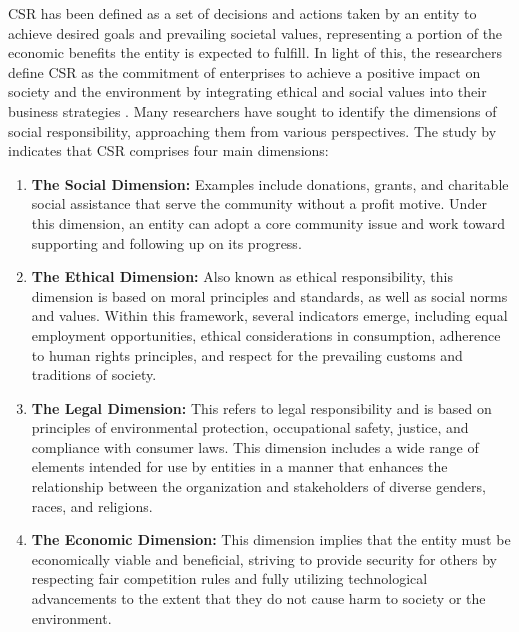 \documentclass{NSP1}
\begin{document}
CSR has been defined as a set of decisions and actions taken by an entity to achieve desired goals and prevailing societal values, representing a portion of the economic benefits the entity is expected to fulfill. In light of this, the researchers define CSR as the commitment of enterprises to achieve a positive impact on society and the environment by integrating ethical and social values into their business strategies \cite{ref6,ref20,ref40,ref39}. Many researchers have sought to identify the dimensions of social responsibility, approaching them from various perspectives. The study by \cite{ref25} indicates that CSR comprises four main dimensions:
\begin{enumerate}
\item[a)] \textbf{The Social Dimension:} Examples include donations, grants, and charitable social assistance that serve the community without a profit motive. Under this dimension, an entity can adopt a core community issue and work toward supporting and following up on its progress.
\item[b)] \textbf{The Ethical Dimension:} Also known as ethical responsibility, this dimension is based on moral principles and standards, as well as social norms and values. Within this framework, several indicators emerge, including equal employment opportunities, ethical considerations in consumption, adherence to human rights principles, and respect for the prevailing customs and traditions of society.
\item[c)] \textbf{The Legal Dimension:} This refers to legal responsibility and is based on principles of environmental protection, occupational safety, justice, and compliance with consumer laws. This dimension includes a wide range of elements intended for use by entities in a manner that enhances the relationship between the organization and stakeholders of diverse genders, races, and religions.
\item[d)] \textbf{The Economic Dimension:} This dimension implies that the entity must be economically viable and beneficial, striving to provide security for others by respecting fair competition rules and fully utilizing technological advancements to the extent that they do not cause harm to society or the environment.
\end{enumerate}
\end{document}
